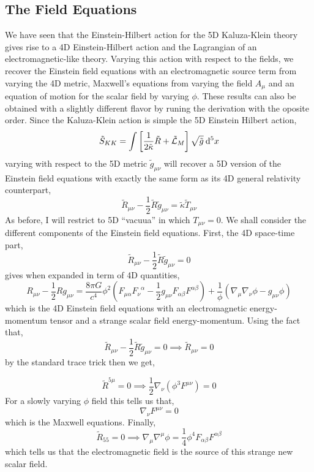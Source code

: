 \documentclass[11pt, a4paper]{article}
\begin{document}
\subsection{The Field Equations}

We have seen that the Einstein-Hilbert action for the 5D Kaluza-Klein theory gives rise to a 4D Einstein-Hilbert action and the Lagrangian of an electromagnetic-like theory. Varying this action with respect to the fields, we recover the Einstein field equations with an electromagnetic source term from varying the 4D metric, Maxwell's equations from varying the field $A_\mu$ and an equation of motion for the scalar field by varying $\phi$. These results can also be obtained with a slightly different flavor by runing the derivation with the oposite order. Since the Kaluza-Klein action is simple the 5D Einstein Hilbert action,  
\[ \tilde{S}_{KK} = \int \left[ \frac{1}{2 \tilde{\kappa}} \tilde{R} + \tilde{\mathcal{L}}_{M} \right] \sqrt{\tilde{g}} \: \mathrm{d}^{5} x \]
varying with respect to the 5D metric $\tilde{g}_{\mu \nu}$ will recover a 5D version of the Einstein field equations with exactly the same form as its 4D general relativity counterpart,
\[ \tilde{R}_{\mu \nu} - \frac{1}{2} \tilde{R} \tilde{g}_{\mu \nu} = \tilde{\kappa} \tilde{T}_{\mu \nu} \]
As before, I will restrict to 5D ``vacuua'' in which $T_{\mu \nu} = 0$. We shall consider the different components of the Einstein field equations. First, the 4D space-time part,
\[ \tilde{R}_{\mu \nu} - \frac{1}{2} \tilde{R} \tilde{g}_{\mu \nu} = 0\]
gives when expanded in term of 4D quantities,
\[ R_{\mu \nu} - \frac{1}{2} R g_{\mu \nu} = \frac{8 \pi G}{c^4} \phi^2 \left(F_{\mu \alpha} {F_{\nu}}^{\alpha} - \frac{1}{2} g_{\mu \nu} F_{\alpha \beta} F^{\alpha \beta} \right) + \frac{1}{\phi} \left( \nabla_\mu \nabla_\nu \phi - g_{\mu \nu} \phi \right) \]
which is the 4D Einstein field equations with an electromagnetic energy-momentum tensor and a strange scalar field energy-momentum. 
Using the fact that,
\[ \tilde{R}_{\mu \nu} - \frac{1}{2} \tilde{R} \tilde{g}_{\mu \nu} = 0 \implies \tilde{R}_{\mu \nu} = 0\] 
by the standard trace trick then we get,

\[ \tilde{R}^{5 \mu} = 0 \implies \frac{1}{2} \nabla_{\nu} \left( \phi^3 F^{\mu \nu} \right) = 0 \]
For a slowly varying $\phi$ field this tells us that,
\[ \nabla_\nu F^{\mu \nu} = 0 \]
which is the Maxwell equations. 
Finally, 
\[ \tilde{R}_{55} = 0 \implies \nabla_\mu \nabla^\mu \phi = \frac{1}{4} \phi^4 F_{\alpha \beta} F^{\alpha \beta} \]
which tells us that the electromagnetic field is the source of this strange new scalar field. 
\end{document}
